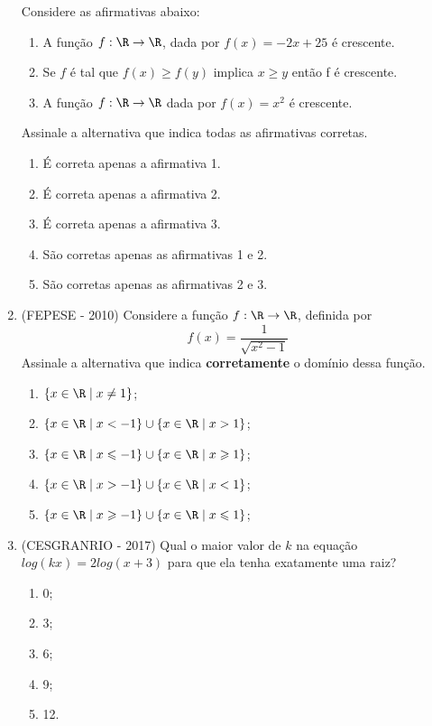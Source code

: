 \begin{enumerate}
Considere as afirmativas abaixo: 
\begin{enumerate}[1.]
\item A função $f:\R \rightarrow \R$, dada por $f(x) = -2x + 25$ é crescente.

\item Se $f$ é tal que $f(x) \geqslant f(y)$ implica $x \geqslant y$ então f é crescente.

\item A função $f: \R \rightarrow \R$ dada por $f(x) = x^2$  é crescente.
\end{enumerate}

Assinale a alternativa que indica todas as afirmativas corretas.

\begin{enumerate}
 \item É correta apenas a afirmativa 1.
 \item É correta apenas a afirmativa 2.
 \item É correta apenas a afirmativa 3.
 \item São corretas apenas as afirmativas 1 e 2.
 \item São corretas apenas as afirmativas 2 e 3. 
\end{enumerate}

\item (FEPESE - 2010) Considere a função $f: \R \rightarrow \R$, definida por
\[f(x)= \frac{1}{\sqrt{x^2 - 1}}\]
Assinale a alternativa que indica \textbf{corretamente} o domínio dessa função.
\begin{enumerate}
\item $\{x \in \R \mid x \neq 1\}$;
\item $\{x \in \R \mid x < -1\} \cup \{x \in \R \mid x > 1\}$;
\item $\{x \in \R \mid x \leqslant -1\} \cup \{x \in \R \mid x \geqslant 1\}$;
\item $\{x \in \R \mid x > -1\} \cup \{x \in \R \mid x < 1\}$;
\item $\{x \in \R \mid x \geqslant -1\} \cup \{x \in \R \mid x \leqslant 1\}$;
\end{enumerate}

\item (CESGRANRIO - 2017) Qual o maior valor de $k$ na equação $log(kx) = 2log(x+3)$ para que ela tenha exatamente uma raiz?
\begin{enumerate}
\item 0;
\item 3;
\item 6;
\item 9;
\item 12.
\end{enumerate}


\end{enumerate}
